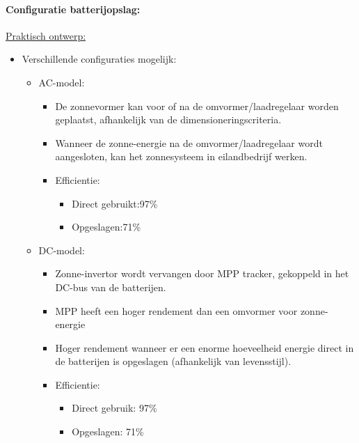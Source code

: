 \documentclass[12pt]{article}
\begin{document}
\paragraph{Configuratie batterijopslag:}
\underline{Praktisch ontwerp:}
\begin{itemize}
    \item Verschillende configuraties mogelijk:\begin{itemize}
        \item AC-model:\begin{itemize}
            \item De zonnevormer kan voor of na de omvormer/laadregelaar worden geplaatst, afhankelijk van de dimensioneringscriteria.
            \item Wanneer de zonne-energie na de omvormer/laadregelaar wordt aangesloten, kan het zonnesysteem in eilandbedrijf werken.
            \item Efficientie:\begin{itemize}
                \item Direct gebruikt:97\%
                \item Opgeslagen:71\%
            \end{itemize}
        \end{itemize}
        \item DC-model:\begin{itemize}
            \item Zonne-invertor wordt vervangen door MPP tracker, gekoppeld in het DC-bus van de batterijen.
            \item MPP heeft een hoger rendement dan een omvormer voor zonne-energie
            \item Hoger rendement wanneer er een enorme hoeveelheid energie direct in de batterijen is opgeslagen (afhankelijk van levensstijl).
            \item Efficientie:\begin{itemize}
                \item Direct gebruik: 97\%
                \item Opgeslagen: 71\%
                \end{itemize}
            \end{itemize}
        \end{itemize}
    \end{itemize}
\end{document}
